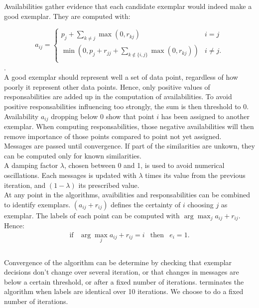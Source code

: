 \documentclass{ipol}
\begin{document}
Availabilities gather evidence that each candidate exemplar would indeed make
a good exemplar. They are computed with:

\begin{equation*}
a_{ij} = \begin{cases}
	    p_j + \sum_{k \neq j} \max(0, r_{kj}) &  i = j \\
	    \min (0, p_j + r_{jj} + \sum_{k \notin \{i, j\} } \max (0, r_{kj}))
	    & i \neq j.\\
	 \end{cases}
\end{equation*}. \\

A good exemplar should represent well a set of data point, regardless of how
poorly it represent other data points. Hence, only positive values of
responsabilities are added up in the computation of availabilities. To avoid
positive responsabilities influencing too strongly, the sum is then threshold
to 0. Availability $a_{ij}$ dropping below 0 show that point $i$ has been
assigned to another exemplar. When computing responsabilities, those negative
availabilities will then remove importance of those points compared to point
not yet assigned. \\

Messages are passed until convergence. If part of the similarities are unkown,
they can be computed only for known similarities. \\

A damping factor $\lambda$, chosen between 0 and 1, is used to avoid numerical
oscillations. Each messages is updated with $\lambda$ times its value from the
previous iteration, and $(1 - \lambda)$ its prescribed value. \\

At any point in the algorithms, avaibilities and responsabilities can be
combined to identify exemplars. $(a_{ij} + r_{ij})$ defines the certainty of
$i$ choosing $j$ as exemplar. The labels of each point can be computed with
$\arg \max_j a_{ij} + r_{ij}$. Hence:
\begin{equation*}
\begin{array}{cccc}
\text{if} & \arg \max_j a_{ij} + r_{ij} = i & \text{then} & e_i = 1. \\
\end{array}
\end{equation*}
\\

Convergence of the algorithm can be determine by checking that exemplar
decisions don't change over several iteration, or that changes in messages are
below a certain threshold, or after a fixed number of iterations.
\cite{frey07affinitypropagation} terminates the algorithm when labels are
identical over 10 iterations. We choose to do a fixed number of iterations.
\end{document}
